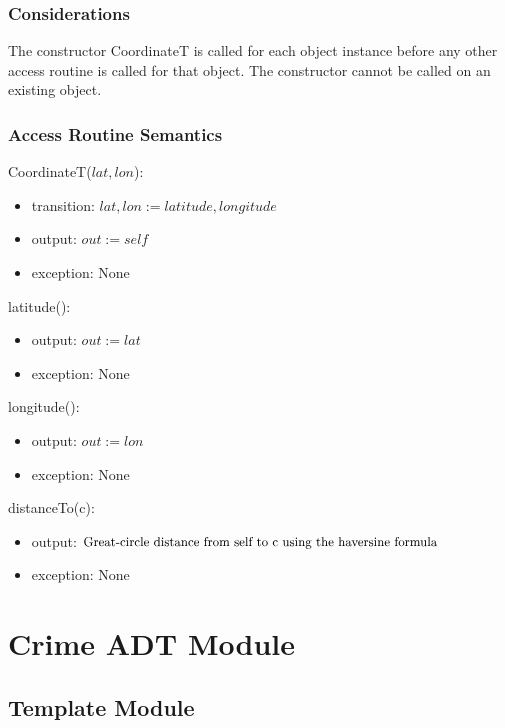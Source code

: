 \documentclass[12pt]{article}
\begin{document}
\subsubsection* {Considerations}

The constructor CoordinateT is called for each object instance before any other
access routine is called for that object.  The constructor cannot be called on
an existing object.

\subsubsection* {Access Routine Semantics}

CoordinateT($lat, lon$):
\begin{itemize}
\item transition: $lat, lon := latitude, longitude$
\item output: $out := \mathit{self}$
\item exception: None
\end{itemize}

\noindent latitude():
\begin{itemize}
\item output: $out := lat$
\item exception: None
\end{itemize}

\noindent longitude():
\begin{itemize}
\item output: $out := lon$
\item exception: None
\end{itemize}

\noindent distanceTo(c):
\begin{itemize}
\item output: $\textnormal{\small{Great-circle distance from self to c using the haversine formula}}$
\item exception: None
\end{itemize}


\newpage


\section* {Crime ADT Module}

\subsection*{Template Module}
\end{document}
